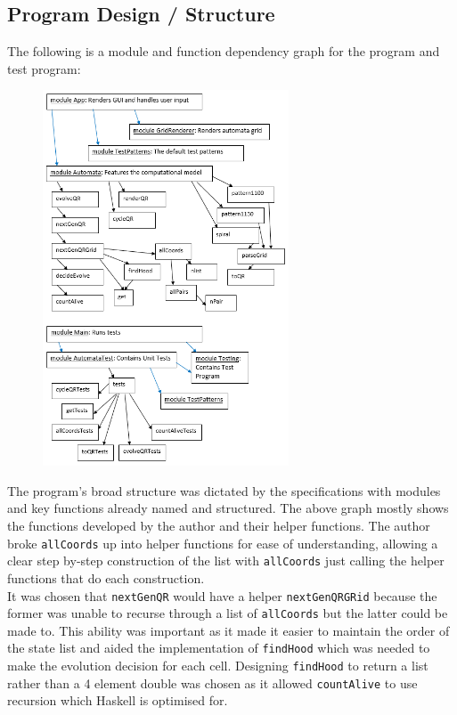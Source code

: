 \documentclass[11pt]{article}
\begin{document}
\subsection{Program Design / Structure}
The following is a module and function dependency graph for the program and test program: 
  \begin{figure}[H]
    \centering
    \includegraphics[width=0.65\textwidth]{funcDep.png}
  \end{figure}
  \newpage
  The program's broad structure was dictated by the specifications with modules and key functions already named and structured. The above graph mostly shows the functions developed by the author and their helper functions.  The author broke \verb|allCoords| up into helper functions for ease of understanding, allowing a clear step by-step construction of the list with \verb|allCoords| just calling the helper functions that do each construction.\\
  
   It was chosen that \verb|nextGenQR| would have a helper \verb|nextGenQRGRid| because the former was unable to recurse through a list of \verb|allCoords| but the latter could be made to. This ability was important as it made it easier to maintain the order of the state list  and aided the implementation of \verb|findHood| which was needed to make the evolution decision for each cell. Designing \verb|findHood| to return a list rather than a 4 element double was chosen as it allowed \verb|countAlive| to use recursion which Haskell is optimised for.\\
   
\end{document}
